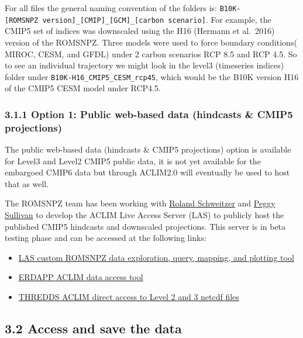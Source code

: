 \documentclass[
]{article}
\begin{document}
For all files the general naming convention of the folders is:
\texttt{B10K-{[}ROMSNPZ\ version{]}\_{[}CMIP{]}\_{[}GCM{]}\_{[}carbon\ scenario{]}}.
For example, the CMIP5 set of indices was downscaled using the H16
(Hermann et al.~2016) version of the ROMSNPZ. Three models were used to
force boundary conditions( MIROC, CESM, and GFDL) under 2 carbon
scenarios RCP 8.5 and RCP 4.5. So to see an individual trajectory we
might look in the level3 (timeseries indices) folder under
\texttt{B10K-H16\_CMIP5\_CESM\_rcp45}, which would be the B10K version
H16 of the CMIP5 CESM model under RCP4.5.

\hypertarget{option-1-public-web-based-data-hindcasts-cmip5-projections}{%
\subsubsection{3.1.1 Option 1: Public web-based data (hindcasts \& CMIP5
projections)}\label{option-1-public-web-based-data-hindcasts-cmip5-projections}}

The public web-based data (hindcasts \& CMIP5 projections) option is
available for Level3 and Level2 CMIP5 public data, it is not yet
available for the embargoed CMIP6 data but through ACLIM2.0 will
eventually be used to host that as well.

The ROMSNPZ team has been working with
\href{roland.schweitzer@noaa.gov}{Roland Schweitzer} and
\href{peggy.sullivan@noaa.gov}{Peggy Sullivan} to develop the ACLIM Live
Access Server (LAS) to publicly host the published CMIP5 hindcasts and
downscaled projections. This server is in beta testing phase and can be
accessed at the following links:

\begin{itemize}
\item
  \href{https://data.pmel.noaa.gov/aclim/las/}{LAS custom ROMSNPZ data
  exploration, query, mapping, and plotting tool}
\item
  \href{https://data.pmel.noaa.gov/aclim/erddap/}{ERDAPP ACLIM data
  access tool}
\item
  \href{https://data.pmel.noaa.gov/aclim/thredds/}{THREDDS ACLIM direct
  access to Level 2 and 3 netcdf files}
\end{itemize}

\hypertarget{access-and-save-the-data}{%
\subsection{3.2 Access and save the
data}\label{access-and-save-the-data}}
\end{document}
